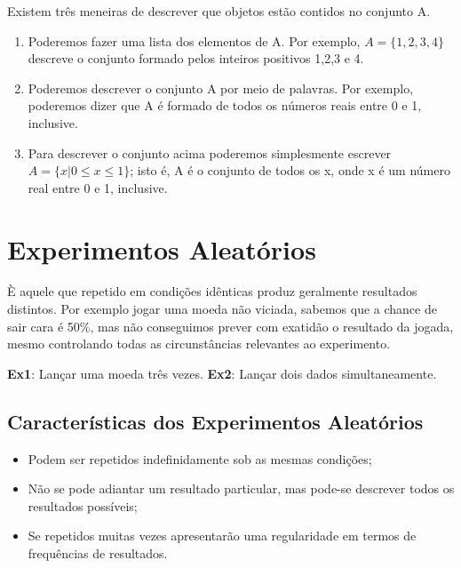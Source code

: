 Existem três meneiras de descrever que objetos estão contidos no conjunto A.

\begin{enumerate}
    \item Poderemos fazer uma lista dos elementos de A. Por
    exemplo, $A = \{ 1,2,3,4 \}$ descreve o conjunto formado pelos
    inteiros positivos 1,2,3 e 4.
    \item Poderemos descrever o conjunto A por meio de palavras.
    Por exemplo, poderemos dizer que A é formado de todos os
    números reais entre 0 e 1, inclusive.
    \item Para descrever o conjunto acima poderemos simplesmente
    escrever $A = \{ x|0\leq x \leq 1 \}$; isto é, A é o conjunto
    de todos os x, onde x é um número real entre 0 e 1, inclusive.
\end{enumerate}


\section{Experimentos Aleatórios}

È aquele que repetido em condições idênticas produz geralmente resultados distintos. Por exemplo jogar uma moeda não viciada, sabemos que a chance de sair cara é 50\%, mas não conseguimos prever com exatidão o resultado da jogada, mesmo controlando todas as circunstâncias relevantes ao experimento.\vskip0.3cm


\textbf{Ex1}: Lançar uma moeda três vezes. \vskip0.3cm
\textbf{Ex2}: Lançar dois dados simultaneamente. \vskip0.3cm

\subsection{Características dos Experimentos Aleatórios}


\begin{itemize}
    \item Podem ser repetidos indefinidamente sob as mesmas
   condições;
   \item Não se pode adiantar um resultado particular, mas
    pode-se descrever todos os resultados possíveis;
    \item Se repetidos muitas vezes apresentarão uma regularidade
    em termos de frequências de resultados.
\end{itemize}


